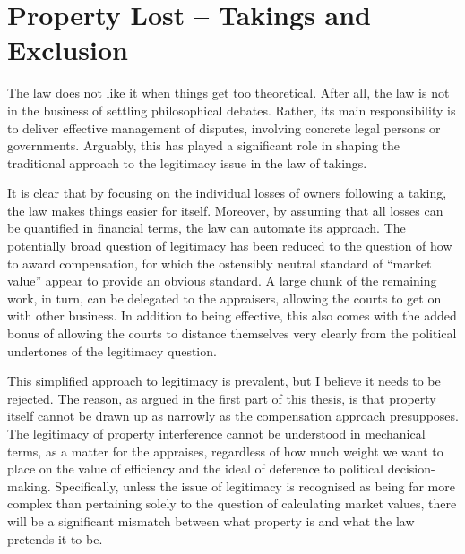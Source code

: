 
\section{Property Lost -- Takings and Exclusion}\label{sec:7:1}

The law does not like it when things get too theoretical. After all, the law is not in the business of settling philosophical debates. Rather, its main responsibility is to deliver effective management of  disputes, involving concrete legal persons or governments. Arguably, this has played a significant role in shaping the traditional approach to the legitimacy issue in the law of takings.

It is clear that by focusing on the individual losses of owners following a taking, the law makes things easier for itself. Moreover, by assuming that all losses can be quantified in financial terms, the law can automate its approach. The potentially broad question of legitimacy has been reduced to the question of how to award compensation, for which the ostensibly neutral standard of ``market value'' appear to provide an obvious standard. A large chunk of the remaining work, in turn, can be delegated to the appraisers, allowing the courts to get on with other business. In addition to being effective, this also comes with the added bonus of allowing the courts to distance themselves very clearly from the political undertones of the legitimacy question.

This simplified approach to legitimacy is prevalent, but I believe it needs to be rejected. The reason, as argued in the first part of this thesis, is that property itself cannot be drawn up as narrowly as the compensation approach presupposes. The legitimacy of property interference cannot be understood in mechanical terms, as a matter for the appraises, regardless of how much weight we want to place on the value of efficiency and the ideal of deference to political decision-making. Specifically, unless the issue of legitimacy is recognised as being far more complex than pertaining solely to the question of calculating market values, there will be a significant mismatch between what property is and what the law pretends it to be.

